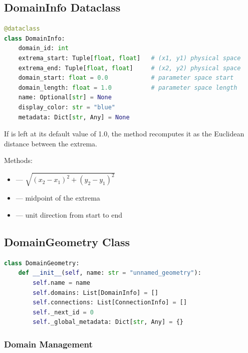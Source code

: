 \subsection{DomainInfo Dataclass}

\begin{structurebox}
\begin{lstlisting}[language=Python]
@dataclass
class DomainInfo:
    domain_id: int
    extrema_start: Tuple[float, float]   # (x1, y1) physical space
    extrema_end: Tuple[float, float]     # (x2, y2) physical space
    domain_start: float = 0.0            # parameter space start
    domain_length: float = 1.0           # parameter space length
    name: Optional[str] = None
    display_color: str = "blue"
    metadata: Dict[str, Any] = None
\end{lstlisting}
\end{structurebox}

\noindent If  is left at its default value of 1.0, the  method recomputes it as the Euclidean distance between the extrema.

\smallskip\noindent Methods:
\begin{itemize}
  \item {} --- $\sqrt{(x_2-x_1)^2+(y_2-y_1)^2}$
  \item {} --- midpoint of the extrema
  \item {} --- unit direction from start to end
\end{itemize}

\subsection{DomainGeometry Class}

\begin{lstlisting}[language=Python, caption={Constructor}]
class DomainGeometry:
    def __init__(self, name: str = "unnamed_geometry"):
        self.name = name
        self.domains: List[DomainInfo] = []
        self.connections: List[ConnectionInfo] = []
        self._next_id = 0
        self._global_metadata: Dict[str, Any] = {}
\end{lstlisting}

\subsubsection{Domain Management}

